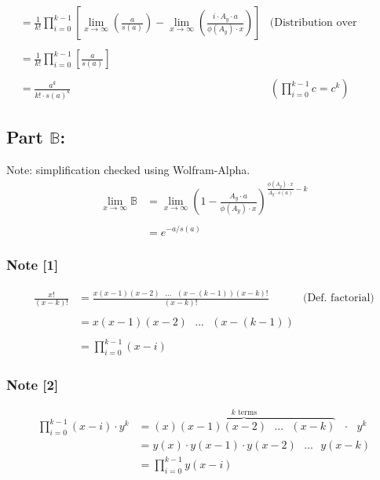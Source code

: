 \documentclass{article}
\theoremstyle{definition}
\begin{document}
\begin{align*}
                                  & = \frac{1}{k!} \prod_{i = 0}^{k-1} \left[  \lim_{x \to \infty} \left(   \frac{a}{ s(a)}\right) -  \lim_{x \to \infty}\left(\frac{i \cdot A_y \cdot a }{\phi(A_y) \cdot x} \right) \right]                         & \text{(Distribution over difference limit law)} \\\\
                                  & = \frac{1}{k!} \prod_{i = 0}^{k-1} \left[     \frac{a}{ s(a)} \right]                                                                                                                                                                                               \\\\
                                  & =\frac{a^k}{k! \cdot s(a)^k}                                                                                                                                                                                      & \left( \prod_{i = 0}^{k-1}c = c^k \right)
\end{align*}

\subsection*{Part $\mathbb{B}$:}
Note: simplification checked using Wolfram-Alpha.
\begin{align*}
    \lim_{x \to \infty} \mathbb{B} & = \lim_{x \to \infty}\left(1- \frac{A_y \cdot a}{\phi(A_y) \cdot x}\right)^{\frac{\phi(A_y) \cdot x}{A_y \cdot s(a)  } -k} \\\\
                                   & = e^{-a/s(a)}
\end{align*}

\subsubsection*{Note [1]}
\begin{align*}
    \frac{x!}{(x-k)!} & = \frac{x(x-1)(x-2) \text{ } ...\text{ } (x-(k-1))(x-k)!  }{(x-k)!} & \text{(Def. factorial)} \\\\
                      & = x(x-1)(x-2) \text{ } ...\text{ } (x-(k-1))                                                  \\\\
                      & = \prod_{i = 0}^{k-1}(x-i)
\end{align*}
\subsubsection*{Note [2]}\begin{align*}
    \prod_{i=0}^{k-1}(x-i) \cdot y^k & = \overbrace {(x)(x-1)(x-2) \text{ } ... \text{ } (x-k)}^{k \text{ terms}} \text{ } \cdot \text{ }y^k \\
                                     & = y(x) \cdot  y(x-1) \cdot y(x-2) \text{ } ... \text{ } y(x-k)                                        \\
                                     & = \prod_{i=0}^{k-1} y(x-i)
\end{align*}



\end{document}

